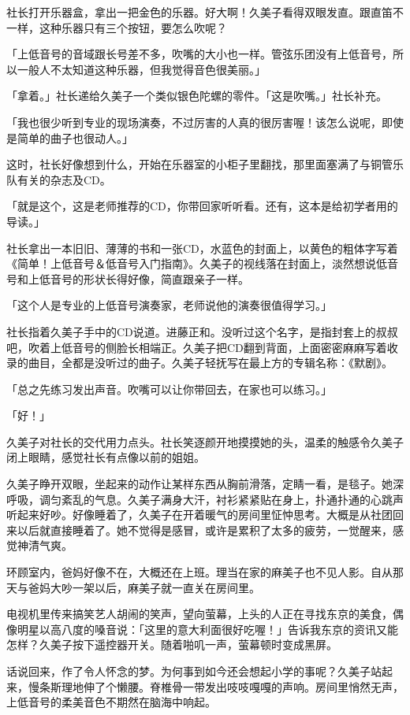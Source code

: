 \documentclass[UTF8]{ctexart}
\begin{document}
    社长打开乐器盒，拿出一把金色的乐器。好大啊！久美子看得双眼发直。跟直笛不一样，这种乐器只有三个按钮，要怎么吹呢？ 

    「上低音号的音域跟长号差不多，吹嘴的大小也一样。管弦乐团没有上低音号，所以一般人不太知道这种乐器，但我觉得音色很美丽。」 

    「拿着。」社长递给久美子一个类似银色陀螺的零件。「这是吹嘴。」社长补充。 

    「我也很少听到专业的现场演奏，不过厉害的人真的很厉害喔！该怎么说呢，即使是简单的曲子也很动人。」 

    这时，社长好像想到什么，开始在乐器室的小柜子里翻找，那里面塞满了与铜管乐队有关的杂志及CD。 

    「就是这个，这是老师推荐的CD，你带回家听听看。还有，这本是给初学者用的导读。」 

    社长拿出一本旧旧、薄薄的书和一张CD，水蓝色的封面上，以黄色的粗体字写着《简单！上低音号＆低音号入门指南》。久美子的视线落在封面上，淡然想说低音号和上低音号的形状长得好像，简直跟亲子一样。 

    「这个人是专业的上低音号演奏家，老师说他的演奏很值得学习。」 

    社长指着久美子手中的CD说道。进藤正和。没听过这个名字，是指封套上的叔叔吧，吹着上低音号的侧脸长相端正。久美子把CD翻到背面，上面密密麻麻写着收录的曲目，全都是没听过的曲子。久美子轻抚写在最上方的专辑名称：《默剧》。 

    「总之先练习发出声音。吹嘴可以让你带回去，在家也可以练习。」 

    「好！」 

    久美子对社长的交代用力点头。社长笑逐颜开地摸摸她的头，温柔的触感令久美子闭上眼睛，感觉社长有点像以前的姐姐。 

    久美子睁开双眼，坐起来的动作让某样东西从胸前滑落，定睛一看，是毯子。她深呼吸，调匀紊乱的气息。久美子满身大汗，衬衫紧紧贴在身上，扑通扑通的心跳声听起来好吵。好像睡着了，久美子在开着暖气的房间里怔忡思考。大概是从社团回来以后就直接睡着了。她不觉得是感冒，或许是累积了太多的疲劳，一觉醒来，感觉神清气爽。 

    环顾室内，爸妈好像不在，大概还在上班。理当在家的麻美子也不见人影。自从那天与爸妈大吵一架以后，麻美子就一直关在房间里。 

    电视机里传来搞笑艺人胡闹的笑声，望向萤幕，上头的人正在寻找东京的美食，偶像明星以高八度的嗓音说：「这里的意大利面很好吃喔！」告诉我东京的资讯又能怎样？久美子按下遥控器开关。随着啪叽一声，萤幕顿时变成黑屏。 

    话说回来，作了令人怀念的梦。为何事到如今还会想起小学的事呢？久美子站起来，慢条斯理地伸了个懒腰。脊椎骨一带发出吱吱嘎嘎的声响。房间里悄然无声，上低音号的柔美音色不期然在脑海中响起。 
\end{document}
